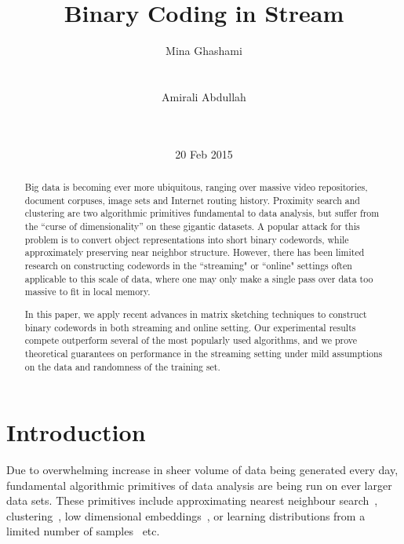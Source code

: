 \documentclass{sig-alternate}
\begin{document}

\title{Binary Coding in Stream}

\author{
\alignauthor
Mina Ghashami
       \\
       \\
       \\
\alignauthor
Amirali Abdullah
\\
       \\
       \\
}

\date{20 Feb 2015}

\maketitle
\begin{abstract}
Big data is becoming ever more ubiquitous, ranging over massive video repositories, document corpuses, image sets and Internet routing history. Proximity search and clustering are two algorithmic primitives fundamental to data analysis, but suffer from the ``curse of dimensionality'' on these gigantic datasets. 
A popular attack for this problem is to convert object representations into short binary codewords, while approximately preserving near neighbor structure. However, there has been limited research on constructing codewords in the ``streaming" or ``online" settings often applicable to this scale of data, where one may only make a single pass over data too massive to fit in local memory. 

In this paper, we apply recent advances in matrix sketching techniques to construct binary codewords in both streaming and online setting. 
Our experimental results compete outperform several of the most popularly used algorithms, and we prove theoretical guarantees on performance in the streaming setting under mild assumptions on the data and randomness of the training set.
\end{abstract}

\section{Introduction}
Due to overwhelming increase in sheer volume of data being generated every day, fundamental algorithmic primitives of data analysis are being run on ever larger data sets. These primitives include approximating nearest neighbour search~\cite{indyk1998approximate, binarylsh}, clustering~\cite{ball1967clustering,kanungo2002efficient}, low dimensional embeddings~\cite{niyogi2004locality,belkin2001laplacian}, or learning distributions from a limited number of samples~\cite{learnability} etc.
\end{document}
